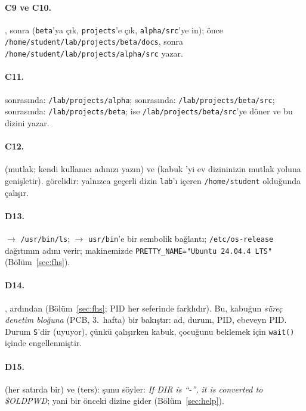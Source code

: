 \paragraph{C9 ve C10.} , sonra  (\texttt{beta}'ya çık, \texttt{projects}'e çık, \texttt{alpha/src}'ye in);  önce \texttt{/home/student/lab/projects/beta/docs}, sonra \texttt{/home/student/lab/projects/alpha/src} yazar.

\paragraph{C11.}  sonrasında: \texttt{\tl/lab/projects/alpha};  sonrasında: \texttt{\tl/lab/projects/beta/src};  sonrasında: \texttt{\tl/lab/projects/beta};  ise \texttt{\tl/lab/projects/beta/src}'ye döner ve bu dizini yazar.

\paragraph{C12.}  (mutlak; kendi kullanıcı adınızı yazın) ve  (kabuk \texttt{\tl}'yi ev dizininizin mutlak yoluna genişletir).  görelidir: yalnızca geçerli dizin \texttt{lab}'ı içeren \texttt{/home/student} olduğunda çalışır.

\paragraph{D13.}  $\to$ \texttt{/usr/bin/ls};  $\to$ \texttt{usr/bin}'e bir sembolik bağlantı; \texttt{/etc/os-release} dağıtımın adını verir; makinemizde \texttt{PRETTY\_NAME="Ubuntu 24.04.4 LTS"} (Bölüm~\ref{sec:fhs}).

\paragraph{D14.} , ardından  (Bölüm~\ref{sec:fhs}; PID her seferinde farklıdır). Bu, kabuğun \emph{süreç denetim bloğuna} (PCB, 3.\ hafta) bir bakıştır: ad, durum, PID, ebeveyn PID. Durum \texttt{S}'dir (uyuyor), çünkü  çalışırken kabuk, çocuğunu beklemek için \texttt{wait()} içinde engellenmiştir.

\paragraph{D15.}  (her satırda bir) ve  (ters):
 şunu söyler: \emph{If DIR is ``-'', it is converted to \$OLDPWD}; yani  bir önceki dizine gider (Bölüm~\ref{sec:help}).

